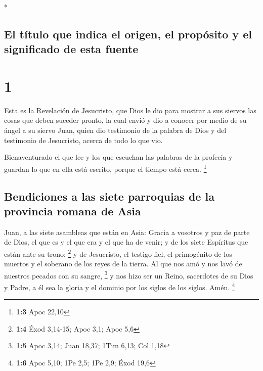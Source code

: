 \begin{paracol}{2} \switchcolumn[0]*

\hypertarget{el-tuxedtulo-que-indica-el-origen-el-propuxf3sito-y-el-significado-de-esta-fuente}{%
\subsection{El título que indica el origen, el propósito y el
significado de esta
fuente}\label{el-tuxedtulo-que-indica-el-origen-el-propuxf3sito-y-el-significado-de-esta-fuente}}

\hypertarget{section}{%
\section{1}\label{section}}

 Esta es la Revelación de Jesucristo, que Dios le dio para
mostrar a sus siervos las cosas que deben suceder pronto, la cual envió
y dio a conocer por medio de su ángel a su siervo Juan, 
quien dio testimonio de la palabra de Dios y del testimonio de
Jesucristo, acerca de todo lo que vio.

 Bienaventurado el que lee y los que escuchan las palabras
de la profecía y guardan lo que en ella está escrito, porque el tiempo
está cerca. \footnote{\textbf{1:3} Apoc 22,10}

\hypertarget{bendiciones-a-las-siete-parroquias-de-la-provincia-romana-de-asia}{%
\subsection{Bendiciones a las siete parroquias de la provincia romana de
Asia}\label{bendiciones-a-las-siete-parroquias-de-la-provincia-romana-de-asia}}

 Juan, a las siete asambleas que están en Asia: Gracia a
vosotros y paz de parte de Dios, el que es y el que era y el que ha de
venir; y de los siete Espíritus que están ante su trono; \footnote{\textbf{1:4}
  Éxod 3,14-15; Apoc 3,1; Apoc 5,6}  y de Jesucristo, el
testigo fiel, el primogénito de los muertos y el soberano de los reyes
de la tierra. Al que nos amó y nos lavó de nuestros pecados con su
sangre, \footnote{\textbf{1:5} Apoc 3,14; Juan 18,37; 1Tim 6,13; Col
  1,18}  y nos hizo ser un Reino, sacerdotes de su Dios y
Padre, a él sea la gloria y el dominio por los siglos de los siglos.
Amén. \footnote{\textbf{1:6} Apoc 5,10; 1Pe 2,5; 1Pe 2,9; Éxod 19,6}


\end{paracol}

